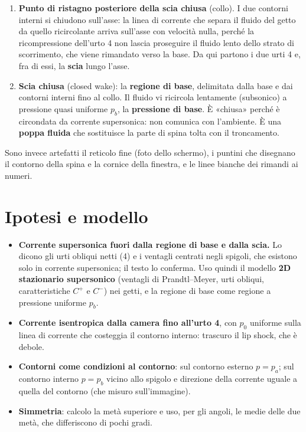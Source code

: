 \documentclass[11pt,a4paper]{article}
\newcommand{\Cp}{C^{+}}
\newcommand{\Cm}{C^{-}}
\begin{document}
\begin{enumerate}
\item \textbf{Punto di ristagno posteriore della scia chiusa} (collo). I due contorni interni si chiudono sull'asse:
  la linea di corrente che separa il fluido del getto da quello ricircolante arriva sull'asse con velocità nulla,
  perché la ricompressione dell'urto 4 non lascia proseguire il fluido lento dello strato di scorrimento, che viene
  rimandato verso la base. Da qui partono i due urti 4 e, fra di essi, la \textbf{scia} lungo l'asse.
\item \textbf{Scia chiusa} (closed wake): la \textbf{regione di base}, delimitata dalla base e dai contorni
  interni fino al collo. Il fluido vi ricircola lentamente (subsonico) a pressione quasi uniforme $p_b$, la
  \textbf{pressione di base}. È «chiusa» perché è circondata da corrente supersonica: non comunica con l'ambiente. È
  una \textbf{poppa fluida} che sostituisce la parte di spina tolta con il troncamento.
\end{enumerate}
Sono invece artefatti il reticolo fine (foto dello schermo), i puntini che disegnano il contorno della spina e la
cornice della finestra, e le linee bianche dei rimandi ai numeri.

\section{Ipotesi e modello}
\begin{itemize}
\item \textbf{Corrente supersonica fuori dalla regione di base e dalla scia.} Lo dicono gli urti obliqui netti (4) e
  i ventagli centrati negli spigoli, che esistono solo in corrente supersonica; il testo lo conferma. Uso quindi il
  modello \textbf{2D stazionario supersonico} (ventagli di Prandtl--Meyer, urti obliqui, caratteristiche $\Cp$ e
  $\Cm$) nei getti, e la regione di base come regione a pressione uniforme $p_b$.
\item \textbf{Corrente isentropica dalla camera fino all'urto 4}, con $p_0$ uniforme sulla linea di corrente che
  costeggia il contorno interno: trascuro il lip shock, che è debole.
\item \textbf{Contorni come condizioni al contorno}: sul contorno esterno $p=p_a$; sul contorno interno $p=p_b$
  vicino allo spigolo e direzione della corrente uguale a quella del contorno (che misuro sull'immagine).
\item \textbf{Simmetria}: calcolo la metà superiore e uso, per gli angoli, le medie delle due metà, che differiscono
  di pochi gradi.
\end{itemize}
\end{document}
